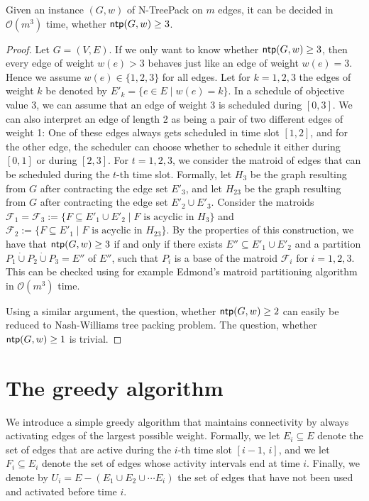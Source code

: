 \documentclass[runningheads]{llncs}
\newcommand{\set}[1]{\{ #1 \}}
\newcommand{\bigO}{\mathcal{O}}
\newcommand{\dotunion}{\mathbin{\dot{\cup}}}
\DeclareMathOperator{\ntp}{\text{\sf ntp}}
\newcommand{\xxxNTP}{{\sc N-TreePack}}
\begin{document}
\begin{theorem}
Given an instance $(G, w)$ of {\xxxNTP} on $m$ edges, it can be decided in $\bigO(m^3)$ time, whether $\ntp(G, w) \geq 3$.
\end{theorem}
\begin{proof}
Let $G = (V, E)$. If we only want to know whether $\ntp(G, w) \geq 3$, then every edge of weight $w(e) > 3$ behaves just like an edge of weight $w(e) = 3$. Hence we assume $w(e) \in \set{1,2,3}$ for all edges. Let for $k = 1,2,3$ the edges of weight $k$ be denoted by $E'_k = \set{e \in E \mid w(e) = k}$. In a schedule of objective value 3, we can assume that an edge of weight 3 is scheduled during $[0, 3]$. We can also interpret an edge of length 2 as being a pair of two different edges of weight 1: One of these edges always gets scheduled in time slot $[1, 2]$, and for the other edge, the scheduler can choose whether to schedule it either during $[0, 1]$ or during $[2, 3]$. For $t = 1,2,3$, we consider the matroid of edges that can be scheduled during the $t$-th time slot. Formally, let $H_3$ be the graph resulting from $G$ after contracting the edge set $E'_3$, and let $H_{23}$ be the graph resulting from $G$ after contracting the edge set $E'_2 \cup E'_3$. Consider the matroids $\mathcal{F}_1 = \mathcal{F}_3 := \set{F \subseteq E'_1 \cup E'_2 \mid F \text{ is acyclic in }H_3}$ and $\mathcal{F}_2 := \set{F \subseteq E'_1 \mid F \text{ is acyclic in }H_{23}}$. By the properties of this construction, we have that $\ntp(G, w) \geq 3$ if and only if there exists $E'' \subseteq E'_1 \cup E'_2$ and a partition $P_1 \dotunion P_2 \dotunion P_3 = E''$ of $E''$, such that $P_i$ is a base of the matroid $\mathcal{F}_i$ for $i=1,2,3$. This can be checked using for example Edmond's matroid partitioning algorithm \cite{edmonds1965minimum} in $\bigO(m^3)$ time.

Using a similar argument, the question, whether $\ntp(G, w) \geq 2$ can easily be reduced to Nash-Williams tree packing problem. The question, whether $\ntp(G, w) \geq 1$ is trivial.
\end{proof}

\section{The greedy algorithm}
\label{sec:greedy}
We introduce a simple greedy algorithm that maintains connectivity by always
activating edges of the largest possible weight.
Formally, we let $E_i\subseteq E$ denote the set of edges that are active during
the $i$-th time slot $[i-1,\,i]$, and we let $F_i\subseteq E_i$ denote the set of
edges whose activity intervals end at time $i$.
Finally, we denote by $U_i=E-(E_1\cup E_2\cup\cdots E_i)$ the set of edges that
have not been used and activated before time $i$.
\end{document}
